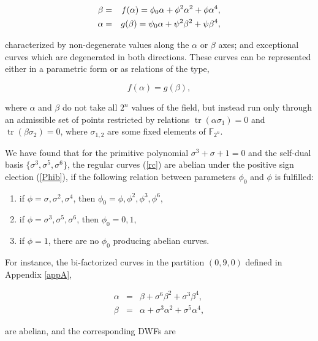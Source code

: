 \documentclass[quantumrep,article,submit,pdftex,moreauthors]{Definitions/mdpi}
\DeclareMathOperator{\tr}{tr}
\begin{document}
\begin{eqnarray}
  \beta &=& f(\alpha) = \phi_{0}\alpha +\phi^{2} \alpha^{2} + \phi \alpha^{4},
  \label{rc} \\
  \alpha &=& g(\beta) = \psi_{0}\alpha +\psi^{2} \beta^{2} + \psi \beta^{4}, 
  \notag
\end{eqnarray}

characterized by non-degenerate values along the $\alpha$ or $\beta$ axes; and
exceptional curves which are degenerated in both directions. These curves
can be represented either in a parametric form or as relations of the type,

\begin{equation*}
  f(\alpha) = g(\beta),
\end{equation*}

where $\alpha$ and $\beta$ do not take all $2^{n}$ values of the field, but
instead run only through an admissible set of points restricted by relations $
\tr(\alpha \sigma_{1}) = 0$ and $\tr(\beta \sigma_{2}) = 0$, where
$\sigma_{1,2}$ are some fixed elements of $\mathbb{F}_{2^{n}}$.

We have found that for the primitive polynomial $\sigma^{3} + \sigma + 1 = 0$
and the self-dual basis $\{\sigma^{3},\sigma^{5},\sigma^{6}\}$, the regular
curves (\ref{rc}) are abelian under the positive sign election (\ref{Phib}), if
the following relation between parameters $\phi_{0}$ and $\phi$ is fulfilled:

\begin{enumerate}
  \item if $\phi =\sigma, \sigma^{2}, \sigma^{4}$, then $\phi_{0} =
    \phi,\phi^{2},\phi^{3}, \phi^{6}$,
  \item if $\phi = \sigma^{3}, \sigma^{5}, \sigma^{6}$, then $\phi_{0}=0,1$,
  \item if $\phi = 1$, there are no $\phi_{0}$ producing abelian curves.
\end{enumerate}

For instance, the bi-factorized curves in the partition $(0,9,0)$ defined in
Appendix \ref{appA},

\begin{eqnarray}
  \alpha &=& \beta + \sigma^{6} \beta^{2} + \sigma^{3}\beta^{4},
  \label{ac1} \\
  \beta &=& \alpha + \sigma^{3} \alpha^{2} + \sigma^{5}\alpha^{4},
  \label{ac2}
\end{eqnarray}

are abelian, and the corresponding DWFs are
\end{document}
